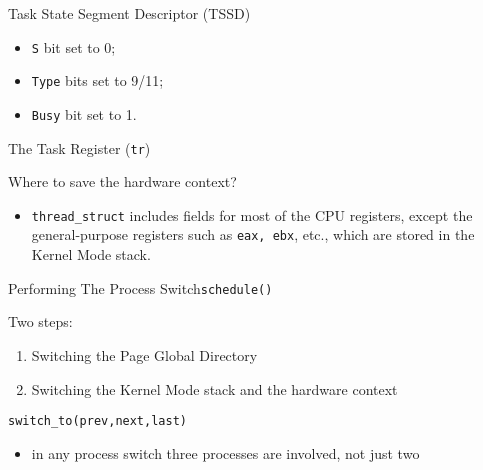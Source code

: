 \begin{frame}
  \begin{block}{Task State Segment Descriptor (TSSD)}
    \begin{center}
    \end{center}
    \begin{itemize}
    \item \texttt{S} bit set to 0;
    \item \texttt{Type} bits set to 9/11;
    \item \texttt{Busy} bit set to 1.
    \end{itemize}
  \end{block}
\end{frame}

\begin{frame}{The Task Register (\texttt{tr})}
  \begin{center}
  \end{center}
\end{frame}

\begin{frame}
  \begin{block}{Where to save the hardware context?}
    \begin{center}
    \end{center}
    \begin{itemize}
    \item \texttt{thread\_struct} includes fields for most of the CPU registers, except the
      general-purpose registers such as \texttt{eax, ebx}, etc., which are stored in
      the Kernel Mode stack.
    \end{itemize}
  \end{block}
\end{frame}

\begin{frame}{Performing The Process Switch}{\texttt{schedule()}}
  \begin{block}{Two steps:}
    \begin{enumerate}
    \item Switching the Page Global Directory
    \item Switching the Kernel Mode stack and the hardware context
    \end{enumerate}
  \end{block}
  \begin{block}{\texttt{switch\_to(prev,next,last)}}
    \begin{itemize}
    \item in any process switch three processes are involved, not just two
    \end{itemize}
  \end{block}
\end{frame}

